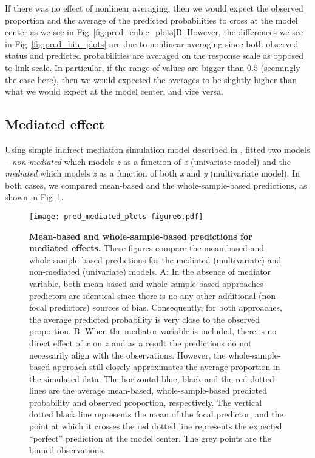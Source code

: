 \documentclass[10pt,letterpaper]{article}
\begin{document}
If there was no effect of nonlinear averaging, then we would expect the observed proportion and the average of the predicted probabilities to cross at the model center as we see in Fig~\ref{fig:pred_cubic_plots}B. However, the differences we see in Fig~\ref{fig:pred_bin_plots} are due to nonlinear averaging since both observed status and predicted probabilities are averaged on the response scale as opposed to link scale. In particular, if the range of values are bigger than $0.5$ (seemingly the case here), then we would expected the averages to be slightly higher than what we would expect at the model center, and vice versa.

\subsection*{Mediated effect}

Using simple indirect mediation simulation model described in , fitted two models -- \emph{non-mediated} which models \emph{z} as a function of \emph{x} (univariate model) and the \emph{mediated} which models \emph{z} as a function of both \emph{x} and \emph{y} (multivariate model). In both cases, we compared mean-based and the whole-sample-based predictions, as shown in Fig~\ref{fig:pred_mediated_plots}.

\begin{figure}[!h]
\centering
\texttt{[image: pred\_mediated\_plots-figure6.pdf]}
\caption{{\bf Mean-based and whole-sample-based predictions for mediated effects.} These figures compare the mean-based and whole-sample-based predictions for the mediated (multivariate) and non-mediated (univariate) models. A: In the absence of mediator variable, both mean-based and whole-sample-based approaches predictors are identical since there is no any other additional (non-focal predictors) sources of bias. Consequently, for both approaches, the average predicted probability is very close to the observed proportion. B: When the mediator variable is included, there is no direct effect of $x$ on $z$ and as a result the predictions do not necessarily align with the observations. However, the whole-sample-based approach still closely approximates the average proportion in the simulated data. The horizontal blue, black and the red dotted lines are the average mean-based, whole-sample-based predicted probability and observed proportion, respectively. The vertical dotted black line represents the mean of the focal predictor, and the point at which it crosses the red dotted line represents the expected ``perfect'' prediction at the model center. The grey points are the binned observations.}
\label{fig:pred_mediated_plots}
\end{figure}
\end{document}
